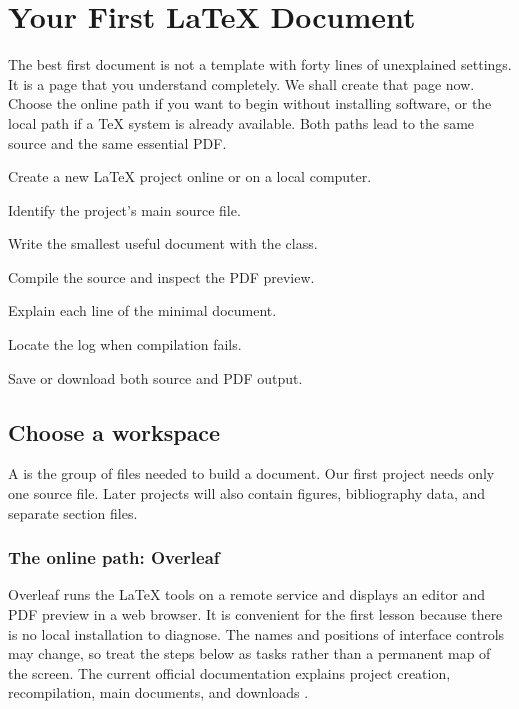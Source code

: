 \chapter{Your First \LaTeX{} Document}
\label{chap:first-document}

The best first document is not a template with forty lines of unexplained
settings. It is a page that you understand completely. We shall create that
page now. Choose the online path if you want to begin without installing
software, or the local path if a TeX system is already available. Both paths
lead to the same  source and the same essential PDF.

\begin{learningoutcomes}
  \item Create a new \LaTeX{} project online or on a local computer.
  \item Identify the project's main source file.
  \item Write the smallest useful document with the  class.
  \item Compile the source and inspect the PDF preview.
  \item Explain each line of the minimal document.
  \item Locate the log when compilation fails.
  \item Save or download both source and PDF output.
\end{learningoutcomes}

\section{Choose a workspace}

A  is the group of files needed to build a document. Our
first project needs only one source file. Later projects will also contain
figures, bibliography data, and separate section files.

\subsection{The online path: Overleaf}

Overleaf runs the \LaTeX{} tools on a remote service and displays an editor and
PDF preview in a web browser. It is convenient for the first lesson because
there is no local installation to diagnose. The names and positions of
interface controls may change, so treat the steps below as tasks rather than a
permanent map of the screen. The current official documentation explains
project creation, recompilation, main documents, and downloads
\parencite{overleafFirstProject,overleafRecompile,overleafMainDocument,
overleafDownload}.

